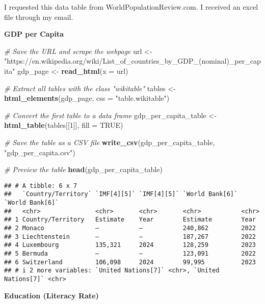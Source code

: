 \documentclass[
]{article}
\newenvironment{Shaded}{\begin{snugshade}}{\end{snugshade}}
\newcommand{\AttributeTok}[1]{\textcolor[rgb]{0.13,0.29,0.53}{#1}}
\newcommand{\CommentTok}[1]{\textcolor[rgb]{0.56,0.35,0.01}{\textit{#1}}}
\newcommand{\ConstantTok}[1]{\textcolor[rgb]{0.56,0.35,0.01}{#1}}
\newcommand{\DecValTok}[1]{\textcolor[rgb]{0.00,0.00,0.81}{#1}}
\newcommand{\FunctionTok}[1]{\textcolor[rgb]{0.13,0.29,0.53}{\textbf{#1}}}
\newcommand{\NormalTok}[1]{#1}
\newcommand{\OtherTok}[1]{\textcolor[rgb]{0.56,0.35,0.01}{#1}}
\newcommand{\StringTok}[1]{\textcolor[rgb]{0.31,0.60,0.02}{#1}}
\begin{document}
I requested this data table from WorldPopulationReview.com. I received
an excel file through my email.

\textbf{GDP per Capita}

\begin{Shaded}
\begin{Highlighting}[]
\CommentTok{\# Save the URL and scrape the webpage}
\NormalTok{url }\OtherTok{\textless{}{-}} \StringTok{"https://en.wikipedia.org/wiki/List\_of\_countries\_by\_GDP\_(nominal)\_per\_capita"}
\NormalTok{gdp\_page }\OtherTok{\textless{}{-}} \FunctionTok{read\_html}\NormalTok{(}\AttributeTok{x =}\NormalTok{ url)}

\CommentTok{\# Extract all tables with the class "wikitable"}
\NormalTok{tables }\OtherTok{\textless{}{-}} \FunctionTok{html\_elements}\NormalTok{(gdp\_page, }\AttributeTok{css =} \StringTok{"table.wikitable"}\NormalTok{)}

\CommentTok{\# Convert the first table to a data frame}
\NormalTok{gdp\_per\_capita\_table }\OtherTok{\textless{}{-}} \FunctionTok{html\_table}\NormalTok{(tables[[}\DecValTok{1}\NormalTok{]], }\AttributeTok{fill =} \ConstantTok{TRUE}\NormalTok{)}

\CommentTok{\# Save the table as a CSV file}
\FunctionTok{write\_csv}\NormalTok{(gdp\_per\_capita\_table, }\StringTok{"gdp\_per\_capita.csv"}\NormalTok{)}

\CommentTok{\# Preview the table}
\FunctionTok{head}\NormalTok{(gdp\_per\_capita\_table)}
\end{Highlighting}
\end{Shaded}

\begin{verbatim}
## # A tibble: 6 x 7
##   `Country/Territory` `IMF[4][5]` `IMF[4][5]` `World Bank[6]` `World Bank[6]`
##   <chr>               <chr>       <chr>       <chr>           <chr>          
## 1 Country/Territory   Estimate    Year        Estimate        Year           
## 2 Monaco              —           —           240,862         2022           
## 3 Liechtenstein       —           —           187,267         2022           
## 4 Luxembourg          135,321     2024        128,259         2023           
## 5 Bermuda             —           —           123,091         2022           
## 6 Switzerland         106,098     2024        99,995          2023           
## # i 2 more variables: `United Nations[7]` <chr>, `United Nations[7]` <chr>
\end{verbatim}

\textbf{Education (Literacy Rate)}
\end{document}
